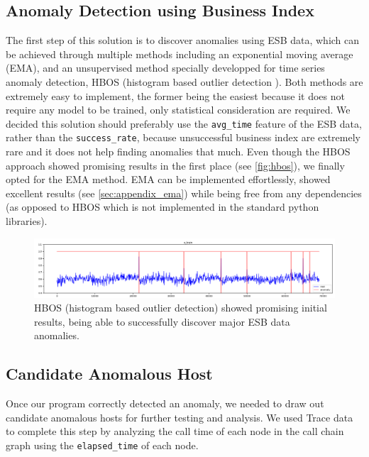 \documentclass[acmsmall, screen, nonacm]{acmart}
\begin{document}
\subsection{Anomaly Detection using Business Index}
The first step of this solution is to discover anomalies using ESB data, which can be achieved through multiple methods including an exponential moving average (EMA), and an unsupervised method specially developped for time series anomaly detection, HBOS (histogram based outlier detection \cite{goldstein_histogram-based_2012}). 
Both methods are extremely easy to implement, the former being the easiest because it does not require any model to be trained, only statistical consideration are required.
We decided this solution should preferably use the \verb|avg_time| feature of the ESB data, rather than the \verb|success_rate|, because unsuccessful business index are extremely rare and it does not help finding anomalies that much. 
Even though the HBOS approach showed promising results in the first place (see \autoref{fig:hbos}), we finally opted for the EMA method. 
EMA can be implemented effortlessly, showed excellent results (see \autoref{sec:appendix_ema}) while being free from any dependencies (as opposed to HBOS which is not implemented in the standard python libraries).

\begin{figure}[h!]
  \centering
  \includegraphics[width=\textwidth]{images/hbos.png}
  \caption{HBOS (histogram based outlier detection) showed promising initial results, being able to successfully discover major ESB data anomalies.}
  \label{fig:hbos}
\end{figure}

\subsection{Candidate Anomalous Host}
Once our program correctly detected an anomaly, we needed to draw out candidate anomalous hosts for further testing and analysis. 
We used Trace data to complete this step by analyzing the call time of each node in the call chain graph using the \verb|elapsed_time| of each node. 
\end{document}
